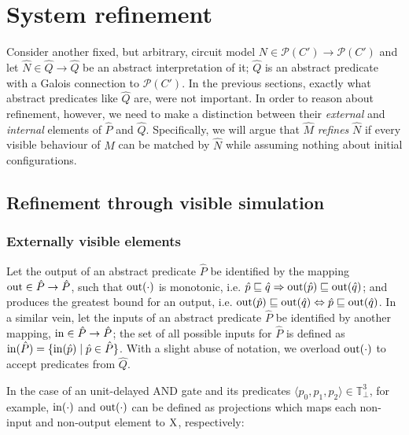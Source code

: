 \section{System refinement}

Consider another fixed, but arbitrary, circuit model $N \in \mathcal{P}(C') \rightarrow \mathcal{P}(C')$ and let $\hat N \in \hat Q \rightarrow \hat Q$ be an abstract interpretation of it; $\hat Q$ is an abstract predicate with a Galois connection to $\mathcal{P}(C')$. In the previous sections, exactly what abstract predicates like $\hat Q$ are, were not important. In order to reason about refinement, however, we need to make a distinction between their \textit{external} and \textit{internal} elements of $\hat P$ and $\hat Q$. Specifically, we will argue that $\hat M$ \textit{refines} $\hat N$ if every visible behaviour of $\hat M$ can be matched by $\hat N$ while assuming nothing about initial configurations.

\subsection{Refinement through visible simulation}

\subsubsection{Externally visible elements} Let the output of an abstract predicate $\hat P$ be identified by the mapping $\operatorname{out} \in \hat P \rightarrow \hat P$, such that $\operatorname{out}(\cdot)$ is monotonic, i.e. $\hat p \sqsubseteq \hat q \Rightarrow \operatorname{out}(\hat p) \sqsubseteq \operatorname{out}(\hat q)$; and produces the greatest bound for an output, i.e. $\operatorname{out}(\hat p) \sqsubseteq \operatorname{out}(\hat q) \Leftrightarrow \hat p \sqsubseteq \operatorname{out}(\hat q)$. In a similar vein, let the inputs of an abstract predicate $\hat P$ be identified by another mapping, $\operatorname{in} \in \hat P \rightarrow \hat P$; the set of all possible inputs for $\hat P$ is defined as $\operatorname{in}(\hat P) = \{ \operatorname{in}(\hat p) \mid \hat p \in \hat P \}$. With a slight abuse of notation, we overload $\operatorname{out}(\cdot)$ to accept predicates from $\hat Q$.

In the case of an unit-delayed AND gate and its predicates $\langle p_{0}, p_{1}, p_{2} \rangle \in \mathbb{T}_{\bot}^{3}$, for example, $\operatorname{in}(\cdot)$ and $\operatorname{out}(\cdot)$ can be defined as projections which maps each non-input and non-output element to $\mathrm{X}$, respectively:


